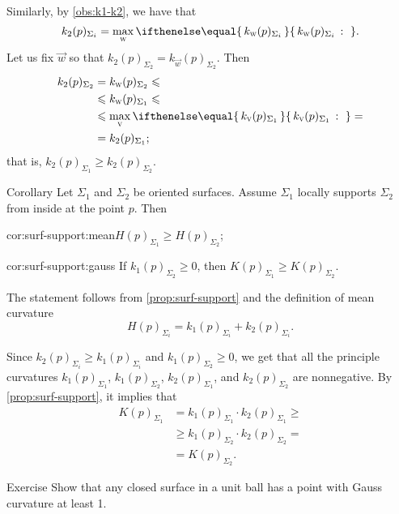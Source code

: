 Similarly, by \ref{obs:k1-k2}, we have that
\[k_2(p)_{\Sigma_i}=\max_{\vec w}\set{k_{\vec w}(p)_{\Sigma_i}}{}.\]
Let us fix ${\vec w}$ so that $k_2(p)_{\Sigma_2}=k_{\vec w}(p)_{\Sigma_2}$.
Then 
\begin{align*}
k_2(p)_{\Sigma_2}&=k_{\vec w}(p)_{\Sigma_2}\le
\\
&\le k_{\vec w}(p)_{\Sigma_1}\le
\\
&\le\max_{\vec v}\set{k_{\vec v}(p)_{\Sigma_1}}{}=
\\
&=k_2(p)_{\Sigma_1};
\end{align*}
that is, $k_2(p)_{\Sigma_1}\ge k_2(p)_{\Sigma_2}$.
\qeds

\begin{thm}{Corollary}\label{cor:surf-support}
Let $\Sigma_1$ and $\Sigma_2$ be oriented surfaces.
Assume $\Sigma_1$ locally supports $\Sigma_2$ from inside at the point $p$.
Then

\begin{subthm}{cor:surf-support:mean}$H(p)_{\Sigma_1}\ge H(p)_{\Sigma_2}$;
\end{subthm}

\begin{subthm}{cor:surf-support:gauss} If $k_1(p)_{\Sigma_2}\ge 0$, then $K(p)_{\Sigma_1}\ge K(p)_{\Sigma_2}$.
\end{subthm}
 
\end{thm}

The statement follows from  \ref{prop:surf-support} and the definition of mean curvature
\[H(p)_{\Sigma_i}=k_1(p)_{\Sigma_i}+k_2(p)_{\Sigma_i}.\]


 Since $k_2(p)_{\Sigma_i}\ge k_1(p)_{\Sigma_i}$ and $k_1(p)_{\Sigma_2}\ge 0$, we get that all the principle curvatures 
$k_1(p)_{\Sigma_1}$, 
$k_1(p)_{\Sigma_2}$, 
$k_2(p)_{\Sigma_1}$, and 
$k_2(p)_{\Sigma_2}$ are nonnegative.
By \ref{prop:surf-support}, it implies that
\begin{align*}
K(p)_{\Sigma_1}&=k_1(p)_{\Sigma_1}\cdot k_2(p)_{\Sigma_1}\ge 
\\
&\ge k_1(p)_{\Sigma_2}\cdot k_2(p)_{\Sigma_2}=
\\
&=K(p)_{\Sigma_2}.
\end{align*}
\qedsf

\begin{thm}{Exercise}\label{ex:positive-gauss-0}
Show that any closed surface in a unit ball has a point with Gauss curvature at least 1.
\end{thm}


